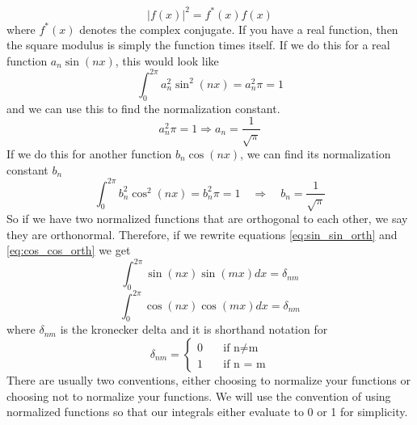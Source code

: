 \documentclass{article}
\newcommand{\be}{\begin{equation}}
\newcommand{\ee}{\end{equation}}
\begin{document}
\be
  |f(x)|^2 = f^*(x) f(x)
\ee
where $f^*(x)$ denotes the complex conjugate.
If you have a real function, then the square modulus is simply the function times itself.
If we do this for a real function $a_n \sin(nx)$, this would look like
\be \label{eq:sin_sin_norm_norm}
  \int_0^{2\pi} a_n^2 \sin^2(nx) = a_n^2\pi = 1
\ee
and we can use this to find the normalization constant.
\be
  a_n^2\pi = 1 \Rightarrow a_n = \frac{1}{\sqrt{\pi}}
\ee
If we do this for another function $b_n \cos(nx)$, we can find its normalization constant $b_n$
\be \label{eq:cos_cos_norm_norm}
  \int_0^{2\pi} b_n^2 \cos^2(nx) = b_n^2\pi = 1 \quad \Rightarrow \quad b_n = \frac{1}{\sqrt{\pi}}
\ee
So if we have two normalized functions that are orthogonal to each other, we say they are orthonormal.
Therefore, if we rewrite equations \ref{eq:sin_sin_orth} and \ref{eq:cos_cos_orth} we get
\be \label{eq:sin_sin_orthonorm}
  \int_0^{2\pi} \sin(nx)\sin(mx) dx = \delta_{nm}
\ee
\be \label{eq:cos_cos_orthonorm}
  \int_0^{2\pi} \cos(nx)\cos(mx) dx = \delta_{nm}
\ee
where $\delta_{nm}$ is the kronecker delta and it is shorthand notation for
\be
\delta_{nm} =
  \left\{
    \begin{array}{ll}
      0 & \quad \text{if n} \neq \text{m} \\
      1 & \quad \text{if n = m}
    \end{array}
  \right.
\ee
There are usually two conventions, either choosing to normalize your functions or choosing not to normalize your functions.
We will use the convention of using normalized functions so that our integrals either evaluate to 0 or 1 for simplicity.
\end{document}
